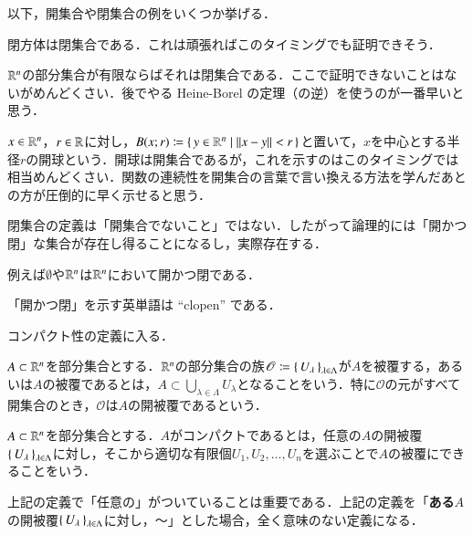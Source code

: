 以下，開集合や閉集合の例をいくつか挙げる．

\begin{que}
閉方体は閉集合である．これは頑張ればこのタイミングでも証明できそう．
\end{que}

\begin{que}
$\mathbb{R}^n$の部分集合が有限ならばそれは閉集合である．ここで証明できないことはないがめんどくさい．後でやる Heine-Borel の定理（の逆）を使うのが一番早いと思う．
\end{que}

\begin{que}
$x\in \mathbb{R}^n$，$r \in \mathbb{R}$に対し，$B(x;r) \coloneqq \set{y \in \mathbb{R}^n | \|x-y\| < r}$と置いて，$x$を中心とする半径$r$の開球という．開球は開集合であるが，これを示すのはこのタイミングでは相当めんどくさい．関数の連続性を開集合の言葉で言い換える方法を学んだあとの方が圧倒的に早く示せると思う．
\end{que}

閉集合の定義は「開集合でないこと」ではない．したがって論理的には「開かつ閉」な集合が存在し得ることになるし，実際存在する．

\begin{que}
例えば$\emptyset$や$\mathbb{R}^n$は$\mathbb{R}^n$において開かつ閉である．
\end{que}

\begin{dig}
「開かつ閉」を示す英単語は ``clopen'' である．
\end{dig}

コンパクト性の定義に入る．

\begin{defi}
$A \subset \mathbb{R}^n$を部分集合とする．$\mathbb{R}^n$の部分集合の族$\mathscr{O} \coloneqq \set{U_\lambda}_{\lambda \in \Lambda}$が$A$を被覆する，あるいは$A$の被覆であるとは，$A \subset \bigcup_{\lambda \in \Lambda} U_\lambda$となることをいう．特に$\mathscr{O}$の元がすべて開集合のとき，$\mathscr{O}$は$A$の開被覆であるという．
\end{defi}

\begin{defi}
$A \subset \mathbb{R}^n$を部分集合とする．$A$がコンパクトであるとは，任意の$A$の開被覆$\set{U_\lambda}_{\lambda \in \Lambda}$に対し，そこから適切な有限個$U_1, U_2, \dots, U_n$を選ぶことで$A$の被覆にできることをいう．
\end{defi}

\begin{que}
上記の定義で「任意の」がついていることは重要である．上記の定義を「{\bf ある}$A$の開被覆$\set{U_\lambda}_{\lambda \in \Lambda}$に対し，〜」とした場合，全く意味のない定義になる．
\end{que}

